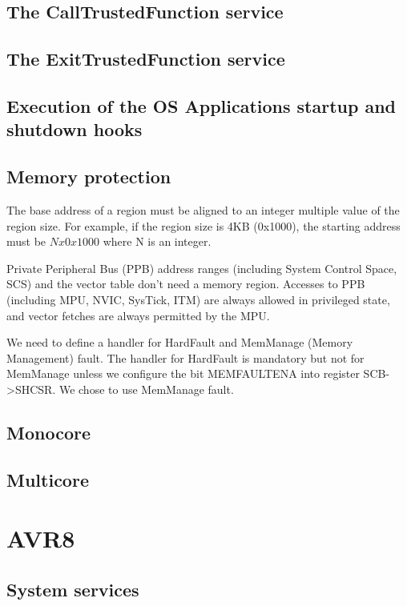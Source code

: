\subsection{The CallTrustedFunction service}
\subsection{The ExitTrustedFunction service}
\subsection{Execution of the OS Applications startup and shutdown hooks}
\subsection{Memory protection}

The base address of a region must be aligned to an integer multiple value of the region size.
For example, if the region size is 4KB (0x1000), the starting address must be $N x 0x1000$ where N is an integer.

Private Peripheral Bus (PPB) address ranges (including System Control Space, SCS) and the vector table don't need a memory region.
Accesses to PPB (including MPU, NVIC, SysTick, ITM) are always allowed in privileged state, and vector fetches are always permitted by the MPU.

We need to define a handler for HardFault and MemManage (Memory Management) fault. The handler for HardFault is mandatory but not for MemManage unless we configure the bit MEMFAULTENA into register SCB->SHCSR.
We chose to use MemManage fault.

\subsection{Monocore}

\subsection{Multicore}


\section{AVR8}
\label{sec:avr8port}

\subsection{System services} \label{sec:avr8portSystemService}

